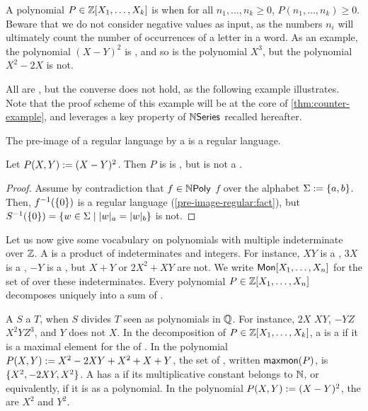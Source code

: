 \AP A polynomial $P \in \mathbb{Z}[X_1, \dots, X_k]$ is  when for
all $n_1, \dots, n_k \geq 0$, $P(n_1, \dots, n_k) \geq 0$. Beware that we do
not consider negative values as input, as the numbers $n_i$ will ultimately
count the number of occurrences of a letter in a word. As an example, the
polynomial $(X - Y)^2$ is , and so is the polynomial $X^3$,
but the polynomial $X^2 - 2X$ is not.

All  are , but the converse does
not hold,
as the following example illustrates. Note that the proof scheme of
this example will be at the core of \cref{thm:counter-example}, and leverages
a key property of $\mathbb{N}\mathsf{Series}$ recalled hereafter.

\begin{fact}
    \label{pre-image-regular:fact}
    The pre-image of a regular language by a 
    is a regular language. 
\end{fact}

\begin{example}
    Let $P(X, Y) \mathrel{:=} (X - Y)^2$.
    Then $P$ is
    is , but is
    not a .
\end{example}
\begin{proof}
    Assume by contradiction that
    $f \in \NPoly$  $f$ over the alphabet $\Sigma \mathrel{:=} \mathopen{\{} a,b \mathclose{\}}$.
    Then, $f^{-1}(\mathopen{\{} 0 \mathclose{\}})$ is a regular language
    (\cref{pre-image-regular:fact}),
    but $S^{-1}(\set{0}) = \setof{ w \in \Sigma }{ \card[a]{w} = \card[b]{w} }$
    is not.
\end{proof}


\AP Let us now give some vocabulary on polynomials with multiple indeterminate
over $\mathbb{Z}$. A  is a product of indeterminates and integers.
For instance, $XY$ is a , $3 X$ is a , $-Y$ is a
, but $X + Y$ or $2X^2 + XY$ are not. We write $\Monomials[X_1,
\dots, X_n]$ for the set of  over these indeterminates.
Every polynomial $P \in \mathbb{Z}[X_1, \dots, X_n]$ decomposes uniquely
into a sum of .

\AP A  $S$  a  $T$, when $S$ divides
$T$ seen as polynomials in $\mathbb{Q}$. For instance, $2X$  $XY$, $-YZ$
 $X^2 Y Z^3$, and $Y$ does not  $X$. In the
decomposition of $P \in \mathbb{Z}[X_1, \dots, X_k]$, a  is a
 if it is a maximal element for the  of . In the polynomial $P(X,Y) \mathrel{:=} X^2 - 2XY + X^2
+ X + Y$, the set of , written
$\mathop{\mathsf{maxmon}}(P)$, is $\mathopen{\{} X^2,  -2 XY,  X^2 \mathclose{\}}$. A  has a
 if its multiplicative constant belongs to
$\mathbb{N}$, or equivalently, if it is  as a polynomial. In the
polynomial $P(X,Y) \mathrel{:=} (X - Y)^2$, the  
are $X^2$ and $Y^2$.
